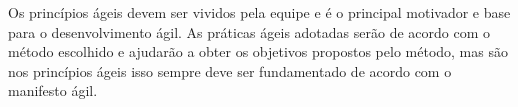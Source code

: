 Os princípios ágeis devem ser vividos pela equipe e é o principal motivador e base para o desenvolvimento ágil. As práticas ágeis adotadas serão de acordo com o método escolhido e ajudarão a obter os objetivos propostos pelo método, mas são nos princípios ágeis isso sempre deve ser fundamentado de acordo com o manifesto ágil.